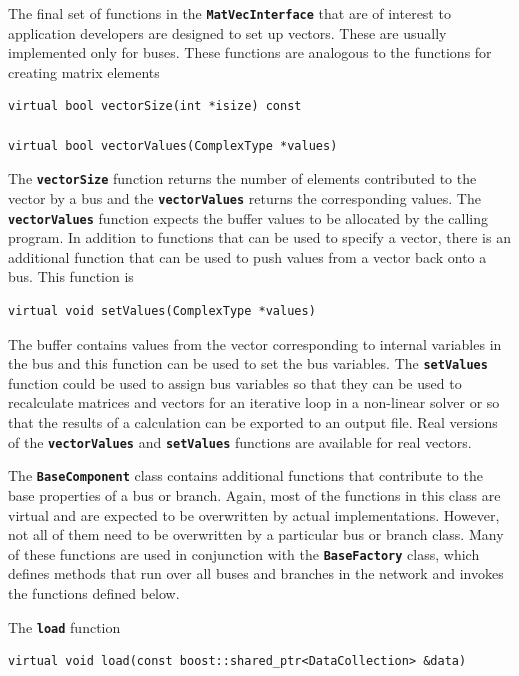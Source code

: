\documentclass[12pt]{report} %
\begin{document}
The final set of functions in the \texttt{\textbf{MatVecInterface}} that are of interest to application developers are designed to set up vectors. These are usually implemented only for buses. These functions are analogous to the functions for creating matrix elements

{
\color{red}
\begin{Verbatim}[fontseries=b]
virtual bool vectorSize(int *isize) const

virtual bool vectorValues(ComplexType *values)
\end{Verbatim}
}

The \texttt{\textbf{vectorSize}} function returns the number of elements contributed to the vector by a bus and the \texttt{\textbf{vectorValues}} returns the corresponding values. The \texttt{\textbf{vectorValues}} function expects the buffer values to be allocated by the calling program. In addition to functions that can be used to specify a vector, there is an additional function that can be used to push values from a vector back onto a bus. This function is

{
\color{red}
\begin{Verbatim}[fontseries=b]
virtual void setValues(ComplexType *values)
\end{Verbatim}
}

The buffer contains values from the vector corresponding to internal variables in the bus and this function can be used to set the bus variables. The \texttt{\textbf{setValues}} function could be used to assign bus variables so that they can be used to recalculate matrices and vectors for an iterative loop in a non-linear solver or so that the results of a calculation can be exported to an output file. Real versions of the \texttt{\textbf{vectorValues}} and \texttt{\textbf{setValues}} functions are available for real vectors.

The \texttt{\textbf{BaseComponent}} class contains additional functions that contribute to the base properties of a bus or branch. Again, most of the functions in this class are virtual and are expected to be overwritten by actual implementations. However, not all of them need to be overwritten by a particular bus or branch class. Many of these functions are used in conjunction with the \texttt{\textbf{BaseFactory}} class, which defines methods that run over all buses and branches in the network and invokes the functions defined below.

The \texttt{\textbf{load}} function

{
\color{red}
\begin{Verbatim}[fontseries=b]
virtual void load(const boost::shared_ptr<DataCollection> &data)
\end{Verbatim}
}
\end{document}
